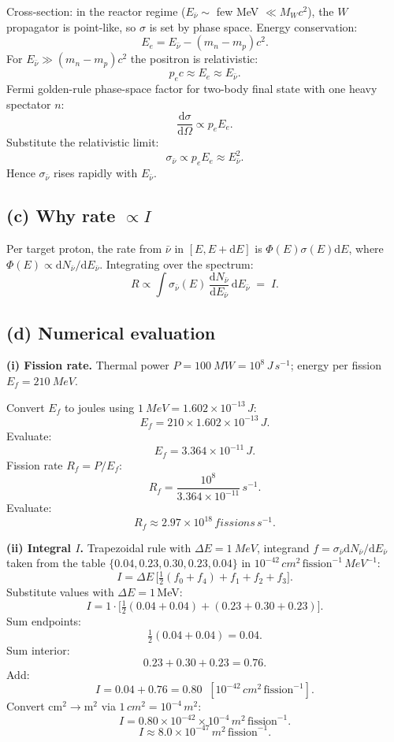 \documentclass[11pt]{article}
\newcommand{\de}{\mathrm{d}}
\begin{document}
Cross-section: in the reactor regime ($E_{\bar\nu}\sim$ few MeV $\ll M_W c^2$), the $W$ propagator is point-like, so $\sigma$ is set by phase space. Energy conservation:
\[ E_e = E_{\bar\nu} - (m_n - m_p)c^2. \]
For $E_{\bar\nu}\gg (m_n-m_p)c^2$ the positron is relativistic:
\[ p_e c \approx E_e \approx E_{\bar\nu}. \]
Fermi golden-rule phase-space factor for two-body final state with one heavy spectator $n$:
\[ \frac{\de\sigma}{\de\Omega}\propto p_e E_e. \]
Substitute the relativistic limit:
\[ \sigma_{\bar\nu}\propto p_e E_e \approx E_{\bar\nu}^2. \]
Hence $\sigma_{\bar\nu}$ rises rapidly with $E_{\bar\nu}$.

\subsection*{(c) Why rate $\propto I$}

Per target proton, the rate from $\bar\nu$ in $[E,E+\de E]$ is $\Phi(E)\sigma(E)\de E$, where $\Phi(E)\propto \de N_{\bar\nu}/\de E_{\bar\nu}$. Integrating over the spectrum:
\[ R \propto \int \sigma_{\bar\nu}(E)\,\frac{\de N_{\bar\nu}}{\de E_{\bar\nu}}\,\de E_{\bar\nu} \;=\; I. \]

\subsection*{(d) Numerical evaluation}

\textbf{(i) Fission rate.} Thermal power $P=\SI{100}{MW}=10^8\,\si{J\,s^{-1}}$; energy per fission $E_f=\SI{210}{MeV}$.

Convert $E_f$ to joules using $\SI{1}{MeV}=1.602\times 10^{-13}\,\si{J}$:
\[ E_f = 210 \times 1.602\times 10^{-13}\,\si{J}. \]
Evaluate:
\[ E_f = 3.364\times 10^{-11}\,\si{J}. \]
Fission rate $R_f = P/E_f$:
\[ R_f = \frac{10^{8}}{3.364\times 10^{-11}}\,\si{s^{-1}}. \]
Evaluate:
\[ \boxed{\;R_f \approx 2.97\times 10^{18}\,\si{fissions\,s^{-1}}.\;} \]

\textbf{(ii) Integral $I$.} Trapezoidal rule with $\Delta E=\SI{1}{MeV}$, integrand $f=\sigma_{\bar\nu}\de N_{\bar\nu}/\de E_{\bar\nu}$ taken from the table $\{0.04,0.23,0.30,0.23,0.04\}$ in $10^{-42}\,\si{cm^2}\,\text{fission}^{-1}\,\si{MeV^{-1}}$:
\[ I = \Delta E\,\big[\tfrac{1}{2}(f_0+f_4) + f_1+f_2+f_3\big]. \]
Substitute values with $\Delta E=1$\,MeV:
\[ I = 1\cdot\big[\tfrac{1}{2}(0.04 + 0.04) + (0.23 + 0.30 + 0.23)\big]. \]
Sum endpoints:
\[ \tfrac{1}{2}(0.04+0.04) = 0.04. \]
Sum interior:
\[ 0.23+0.30+0.23 = 0.76. \]
Add:
\[ I = 0.04 + 0.76 = 0.80 \;\;[10^{-42}\,\si{cm^2}\,\text{fission}^{-1}]. \]
Convert cm$^2\to$m$^2$ via $1\,\si{cm^2}=10^{-4}\,\si{m^2}$:
\[ I = 0.80\times 10^{-42}\times 10^{-4}\,\si{m^2}\,\text{fission}^{-1}. \]
\[ \boxed{\;I \approx 8.0\times 10^{-47}\,\si{m^2}\,\text{fission}^{-1}.\;} \]
\end{document}
